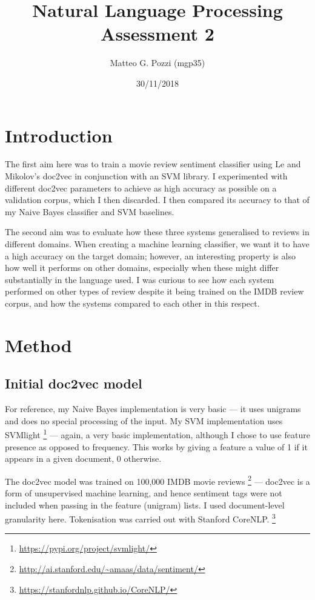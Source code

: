 \documentclass[12pt,a4paper,twoside]{article}
\title{%
  Natural Language Processing \\
  \large Assessment 2}
\author{Matteo G. Pozzi (mgp35)\vspace{-2ex}}
\date{30/11/2018\vspace{-2ex}}
\begin{document}
\maketitle


\section{Introduction}

The first aim here was to train a movie review sentiment classifier using Le and Mikolov's doc2vec in conjunction with an SVM library. I experimented with different doc2vec parameters to achieve as high accuracy as possible on a validation corpus, which I then discarded. I then compared its accuracy to that of my Naive Bayes classifier and SVM baselines.

The second aim was to evaluate how these three systems generalised to reviews in different domains. When creating a machine learning classifier, we want it to have a high accuracy on the target domain; however, an interesting property is also how well it performs on other domains, especially when these might differ substantially in the language used. I was curious to see how each system performed on other types of review despite it being trained on the IMDB review corpus, and how the systems compared to each other in this respect.

\section{Method}

\subsection{Initial doc2vec model}

For reference, my Naive Bayes implementation is very basic --- it uses unigrams and does no special processing of the input. My SVM implementation uses SVMlight \footnote{\url{https://pypi.org/project/svmlight/}} --- again, a very basic implementation, although I chose to use feature presence as opposed to frequency. This works by giving a feature a value of 1 if it appears in a given document, 0 otherwise.

The doc2vec model was trained on 100,000 IMDB movie reviews \footnote{\url{http://ai.stanford.edu/~amaas/data/sentiment/}} --- doc2vec is a form of unsupervised machine learning, and hence sentiment tags were not included when passing in the feature (unigram) lists. I used document-level granularity here. Tokenisation was carried out with Stanford CoreNLP. \footnote{\url{https://stanfordnlp.github.io/CoreNLP/}}
\end{document}
